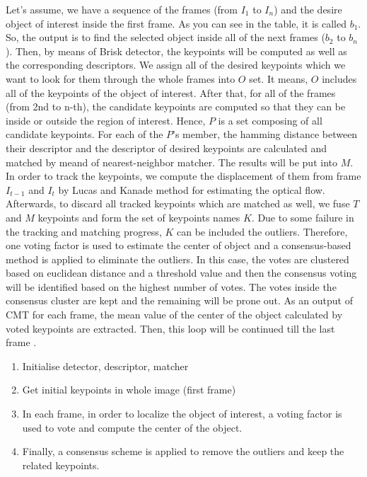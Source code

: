 \documentclass[[12pt,DIV14,BCOR12mm,a4paper,footexclude,headinclude,halfparskip-,twoside,openright,cleardoubleempty,idxtotoc,bibtotoc]{article}
\begin{document}
Let's assume, we have a sequence of the frames (from $I_1$ to $I_n$) and the desire object of interest inside the first frame. As you can see in the table, it is called $b_1$. 
So, the output is to find the selected object inside all of the next frames ($b_2$ to $b_n$). Then, by means of Brisk detector, the keypoints will be computed as well as the corresponding descriptors. We assign all of the desired keypoints which we want to look for them through the whole frames into $O$ set. It means, $O$ includes all of the keypoints of the object of interest. After that, for all of the frames (from 2nd to n-th), the candidate keypoints are computed so that they can be inside or outside the region of interest. Hence, $P$ is a set composing of all candidate keypoints. For each of the $P$'s member, the hamming distance between their descriptor and the descriptor of desired keypoints are calculated and matched by meand of nearest-neighbor matcher. The results will be put into $M$. In order to track the keypoints, we compute the displacement of them from frame $I_{t-1}$ and $I_{t}$ by Lucas and Kanade method for estimating the optical flow. Afterwards, to discard all tracked keypoints which are matched as well, we fuse $T$ and $M$ keypoints and form the set of keypoints names $K$. Due to some failure in the tracking and matching progress, $K$ can be included the outliers. Therefore, one voting factor is used to estimate the center of object and a consensus-based method is applied to eliminate the outliers. In this case, the votes are clustered based on euclidean distance and a threshold value and then the consensus voting will be identified based on the highest number of votes. The votes inside the consensus cluster are kept and the remaining will be prone out. As an output of CMT for each frame, the mean value of the center of the object calculated by voted keypoints are extracted. Then, this loop will be continued till the last frame \cite{nebehay2014consensus}.


\begin{enumerate}

\item Initialise detector, descriptor, matcher
\item Get initial keypoints in whole image (first frame)
\item In each frame, in order to localize the object of interest, a voting factor is used to vote and compute the center of the object.
\item Finally, a consensus scheme is applied to remove the outliers and keep the related keypoints.
\end{enumerate}
\end{document}
